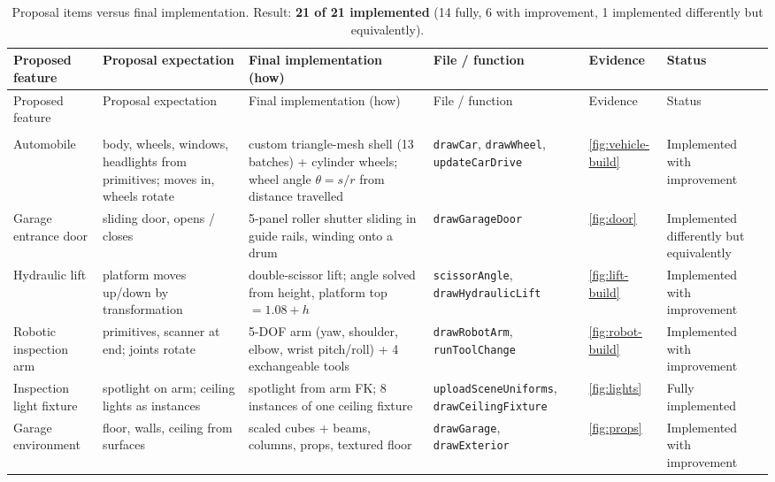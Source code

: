 \documentclass[10pt,a4paper]{article}
\newcommand{\fn}[1]{\texttt{#1}}
\let\oldtoprule\toprule
\renewcommand{\toprule}{\oldtoprule\rowcolor{smhead}}
\begin{document}
{\scriptsize\setlength{\tabcolsep}{3pt}
\begin{longtable}{@{}>{\raggedright}p{2.3cm}>{\raggedright}p{2.4cm}>{\raggedright}p{4.3cm}>{\raggedright}p{3.2cm}>{\raggedright}p{1.25cm}>{\raggedright\arraybackslash}p{2.3cm}@{}}
\caption{Proposal items versus final implementation. Result: \textbf{21 of 21 implemented} (14 fully, 6 with improvement, 1 implemented differently but equivalently).}\label{tab:proposal}\\
\toprule Proposed feature & Proposal expectation & Final implementation (how) & File / function & Evidence & Status\\\midrule\endfirsthead
\toprule Proposed feature & Proposal expectation & Final implementation (how) & File / function & Evidence & Status\\\midrule\endhead
\bottomrule\endfoot
\multicolumn{6}{@{}l}{\textbf{Scene objects}}\\
Automobile & body, wheels, windows, headlights from primitives; moves in, wheels rotate & custom triangle-mesh shell (13 batches) + cylinder wheels; wheel angle $\theta=s/r$ from distance travelled & \fn{drawCar}, \fn{drawWheel}, \fn{updateCarDrive} & \ref{fig:vehicle-build} & Implemented with improvement\\
Garage entrance door & sliding door, opens / closes & 5-panel roller shutter sliding in guide rails, winding onto a drum & \fn{drawGarageDoor} & \ref{fig:door} & Implemented differently but equivalently\\
Hydraulic lift & platform moves up/down by transformation & double-scissor lift; angle solved from height, platform top $=1.08+h$ & \fn{scissorAngle}, \fn{drawHydraulicLift} & \ref{fig:lift-build} & Implemented with improvement\\
Robotic inspection arm & primitives, scanner at end; joints rotate & 5-DOF arm (yaw, shoulder, elbow, wrist pitch/roll) + 4 exchangeable tools & \fn{drawRobotArm}, \fn{runToolChange} & \ref{fig:robot-build} & Implemented with improvement\\
Inspection light fixture & spotlight on arm; ceiling lights as instances & spotlight from arm FK; 8 instances of one ceiling fixture & \fn{uploadSceneUniforms}, \fn{drawCeilingFixture} & \ref{fig:lights} & Fully implemented\\
Garage environment & floor, walls, ceiling from surfaces & scaled cubes + beams, columns, props, textured floor & \fn{drawGarage}, \fn{drawExterior} & \ref{fig:props} & Implemented with improvement\\

\end{longtable}}
\end{document}
